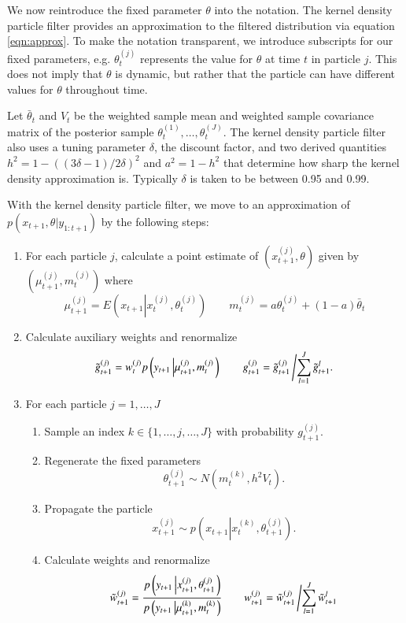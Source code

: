 \documentclass{elsarticle}
\begin{document}
We now reintroduce the fixed parameter $\theta$ into the notation. The kernel density particle filter provides an approximation to the filtered distribution via equation \eqref{eqn:approx}. To make the notation transparent, we introduce subscripts for our fixed parameters, e.g. $\theta_t^{(j)}$ represents the value for $\theta$ at time $t$ in particle $j$. This does not imply that $\theta$ is dynamic, but rather that the particle can have different values for $\theta$ throughout time.

Let $\bar{\theta}_t$ and $V_t$ be the weighted sample mean and weighted sample covariance matrix of the posterior sample $\theta_t^{(1)},\ldots,\theta_t^{(J)}$.  The kernel density particle filter also uses a tuning parameter $\delta$, the discount factor, and two derived quantities $h^2 = 1 - ((3\delta - 1)/2\delta)^2$ and $a^2 = 1 - h^2$ that determine how sharp the kernel density approximation is. Typically $\delta$ is taken to be between 0.95 and 0.99.

With the kernel density particle filter, we move to an approximation of $p(x_{t+1},\theta|y_{1:t+1})$ by the following steps:

\begin{enumerate}
\item For each particle $j$, calculate a point estimate of $\left(x_{t+1}^{(j)},\theta\right)$ given by $\left(\mu_{t+1}^{(j)},m_t^{(j)}\right)$ where
    \[
    \mu_{t+1}^{(j)} = E\left(x_{t+1}\left|x_t^{(j)},\theta_t^{(j)} \right.\right) \qquad
    m_t^{(j)} = a\theta_t^{(j)} + (1-a)\bar{\theta}_t
    \]
\item Calculate auxiliary weights and renormalize
\[ \tilde{g}_{t+1}^{(j)} = w_t^{(j)} p\left(y_{t+1}\left|\mu_{t+1}^{(j)},m_t^{(j)}\right.\right) \qquad g_{t+1}^{(j)} = \tilde{g}_{t+1}^{(j)}\left/ \sum_{l=1}^J \tilde{g}_{t+1}^l. \right. \]
\item For each particle $j=1,\ldots,J$
	\begin{enumerate}
	\item Sample an index $k\in\{1,\ldots,j,\ldots,J\}$ with probability $g_{t+1}^{(j)}$.
	\item Regenerate the fixed parameters
	\[ \theta_{t+1}^{(j)} \sim N\left( m_t^{(k)}, h^2V_t \right). \]
	\item Propagate the particle
	\[ x_{t+1}^{(j)} \sim p\left(x_{t+1}\left|x_t^{(k)},\theta_{t+1}^{(j)}\right.\right). \]
	\item Calculate weights and renormalize
	\[\tilde{w}_{t+1}^{(j)} = \frac{p\left(y_{t+1}\left|x_{t+1}^{(j)},\theta_{t+1}^{(j)}\right.\right)}{p\left(y_{t+1}\left|\mu_{t+1}^{(k)},m_t^{(k)}\right.\right)}
	\qquad
	w_{t+1}^{(j)} = \tilde{w}_{t+1}^{(j)}\left/\sum_{l=1}^J \tilde{w}_{t+1}^l \right.\]
	\end{enumerate}
\end{enumerate}
\end{document}
